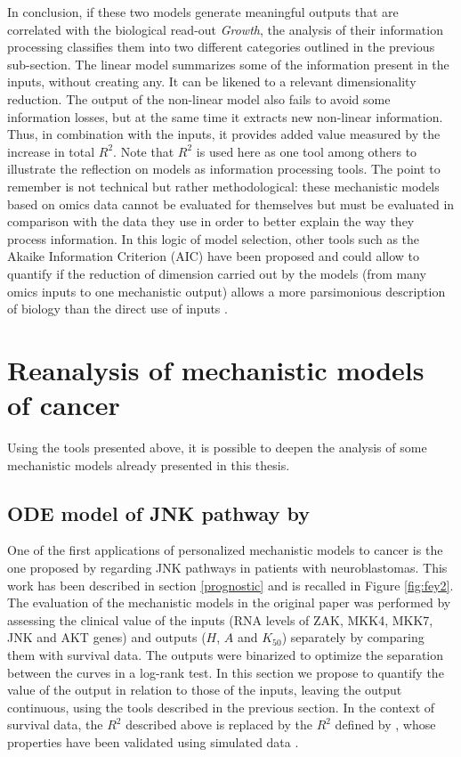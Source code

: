 \documentclass[a4paper,12pt,twoside,onecolumn,openright,final,oldfontcommands]{memoir}
\begin{document}
In conclusion, if these two models generate meaningful outputs that are
correlated with the biological read-out \emph{Growth}, the analysis of
their information processing classifies them into two different
categories outlined in the previous sub-section. The linear model
summarizes some of the information present in the inputs, without
creating any. It can be likened to a relevant dimensionality reduction.
The output of the non-linear model also fails to avoid some information
losses, but at the same time it extracts new non-linear information.
Thus, in combination with the inputs, it provides added value measured
by the increase in total \(R^2\). Note that \(R^2\) is used here as one
tool among others to illustrate the reflection on models as information
processing tools. The point to remember is not technical but rather
methodological: these mechanistic models based on omics data cannot be
evaluated for themselves but must be evaluated in comparison with the
data they use in order to better explain the way they process
information. In this logic of model selection, other tools such as the
Akaike Information Criterion (AIC) have been proposed and could allow to
quantify if the reduction of dimension carried out by the models (from
many omics inputs to one mechanistic output) allows a more parsimonious
description of biology than the direct use of inputs
\citep{kirk2013model}.

\section{Reanalysis of mechanistic models of
cancer}\label{reanalysis-of-mechanistic-models-of-cancer}

Using the tools presented above, it is possible to deepen the analysis
of some mechanistic models already presented in this thesis.

\subsection{\texorpdfstring{ODE model of JNK pathway by
\citet{fey2015signaling}}{ODE model of JNK pathway by @fey2015signaling}}\label{ode-model-of-jnk-pathway-by-fey2015signaling}

One of the first applications of personalized mechanistic models to
cancer is the one proposed by \citet{fey2015signaling} regarding JNK
pathways in patients with neuroblastomas. This work has been described
in section \ref{prognostic} and is recalled in Figure \ref{fig:fey2}.
The evaluation of the mechanistic models in the original paper was
performed by assessing the clinical value of the inputs (RNA levels of
ZAK, MKK4, MKK7, JNK and AKT genes) and outputs (\(H\), \(A\) and
\(K_{50}\)) separately by comparing them with survival data. The outputs
were binarized to optimize the separation between the curves in a
log-rank test. In this section we propose to quantify the value of the
output in relation to those of the inputs, leaving the output
continuous, using the tools described in the previous section. In the
context of survival data, the \(R^2\) described above is replaced by the
\(R^2\) defined by \citet{royston2004new}, whose properties have been
validated using simulated data \citep{choodari2012simulation}.
\end{document}

